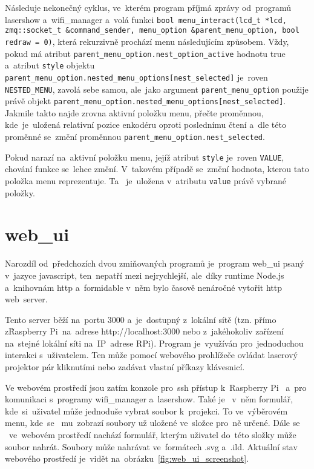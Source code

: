         Následuje nekonečný cyklus, ve~kterém program příjmá zprávy od~programů lasershow  a~wifi\_manager  a~volá funkci \texttt{bool menu_interact(lcd_t *lcd, zmq::socket_t &command_sender, menu_option &parent_menu_option, bool redraw = 0)}, která rekurzivně prochází menu následujícím způsobem.
Vždy, pokud má atribut \texttt{parent_menu_option.nest_option_active} hodnotu true  a~atribut \texttt{style} objektu \texttt{parent_menu_option.nested_menu_options[nest_selected]} je~roven \texttt{NESTED_MENU}, zavolá sebe samou,  ale~jako argument \texttt{parent_menu_option} použije právě objekt \texttt{parent_menu_option.nested_menu_options[nest_selected]}.
Jakmile takto najde zrovna aktivní položku menu, přečte proměnnou,  kde~je~uložená relativní pozice enkodéru oproti poslednímu čtení  a~dle této proměnné se~změní proměnnou \texttt{parent_menu_option.nest_selected}.

Pokud narazí na~aktivní položku menu, jejíž atribut \texttt{style} je~roven \texttt{VALUE}, chování funkce se~lehce změní.  V~takovém případě se~změní hodnota, kterou tato položka menu reprezentuje. Ta ~je~uložena  v~atributu \texttt{value} právě vybrané položky.

\section{web\_ui}

Narozdíl od~předchozích dvou zmiňovaných programů je~program web\_ui psaný v~jazyce javascript,  ten~nepatří mezi nejrychlejší,  ale~díky runtime Node.js a~knihovnám http a~formidable v~něm bylo časově nenáročné vytořit http  web~server.

Tento server běží na~portu 3000 a~je~dostupný z~lokální sítě (tzn. přímo z\~Raspberry Pi~na~adrese http://localhost:3000 nebo z~jakéhokoliv zařízení na~stejné lokální síti na~IP~adrese RPi).
Program je~využíván  pro~jednoduchou interakci s~uživatelem.
Ten může pomocí webového prohlížeče ovládat laserový projektor pár kliknutími nebo zadávat vlastní příkazy klávesnicí.

Ve webovém prostředí jsou zatím konzole  pro~ssh přístup  k~Raspberry Pi ~a~pro komunikaci  s~programy wifi\_manager a~lasershow.
Také je ~v~něm formulář,  kde~si~uživatel může jednoduše vybrat soubor  k~projekci.
To ve~výběrovém menu,  kde~se ~mu~zobrazí soubory už uložené ve~složce  pro~ně určené. Dále se ~ve~webovém prostředí nachází formulář, kterým uživatel do~této složky může soubor nahrát. Soubory může nahrávat ve~formátech .svg  a~.ild.
Aktuální stav webového prostředí je~vidět na~obrázku~\ref{fig:web_ui_screenshot}.

